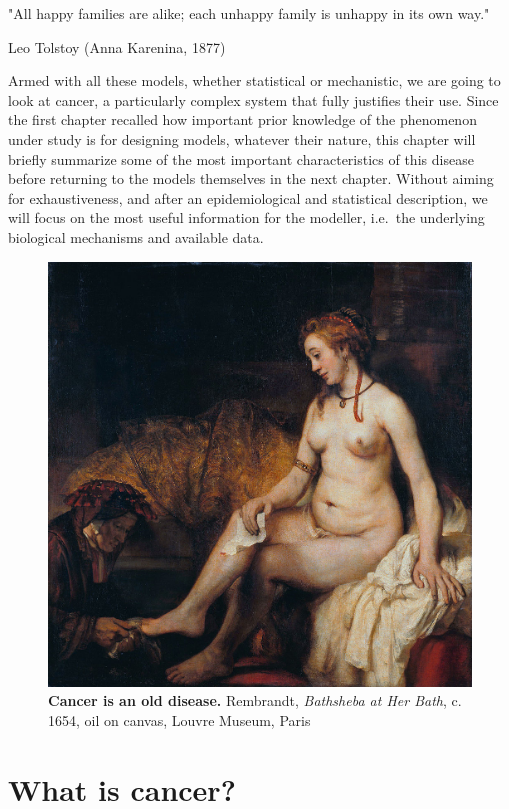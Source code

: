 \documentclass[a4paper,12pt,twoside,onecolumn,openright,final,oldfontcommands]{memoir}
\newcommand{\initial}[1]{
	\lettrine[lines=3,lhang=0.33,nindent=0em]{
		\color{gray}
     		{\textsc{#1}}}{}}
\begin{document}
\epigraph{"All happy families are alike; each unhappy family is unhappy in its own way."}{Leo Tolstoy (Anna Karenina, 1877)}

\initial{A}rmed with all these models, whether statistical or
mechanistic, we are going to look at cancer, a particularly complex
system that fully justifies their use. Since the first chapter recalled
how important prior knowledge of the phenomenon under study is for
designing models, whatever their nature, this chapter will briefly
summarize some of the most important characteristics of this disease
before returning to the models themselves in the next chapter. Without
aiming for exhaustiveness, and after an epidemiological and statistical
description, we will focus on the most useful information for the
modeller, i.e.~the underlying biological mechanisms and available data.

\begin{figure}

{\centering \includegraphics[width=0.9\linewidth]{fig/bath} 

}

\caption[Cancer is an old disease]{\textbf{Cancer is an old disease.} Rembrandt,
\emph{Bathsheba at Her Bath}, c. 1654, oil on canvas, Louvre Museum,
Paris}\label{fig:bath}
\end{figure}





\section{What is cancer?}\label{what-is-cancer}
\end{document}
